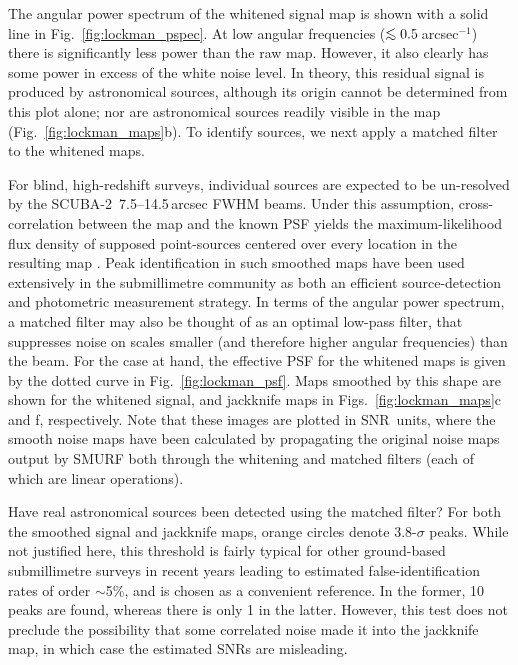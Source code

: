 \documentclass[useAMS,usenatbib,nofootinbib]{mn2e}
\newcommand{\snr}{SNR}
\newcommand{\scuba}{SCUBA-2}
\def\lsim{\mathrel{\lower2.5pt\vbox{\lineskip=0pt\baselineskip=0pt
          \hbox{$<$}\hbox{$\sim$}}}}
\begin{document}
The angular power spectrum of the whitened signal map is shown with a
solid line in Fig.~\ref{fig:lockman_pspec}. At low angular frequencies
($\lsim 0.5$\,arcsec$^{-1}$) there is significantly less power than
the raw map. However, it also clearly has some power in excess of the
white noise level. In theory, this residual signal is produced by
astronomical sources, although its origin cannot be determined from
this plot alone; nor are astronomical sources readily visible in the
map (Fig.~\ref{fig:lockman_maps}b). To identify sources, we next apply
a matched filter to the whitened maps.

For blind, high-redshift surveys, individual sources are expected to
be un-resolved by the \scuba\ 7.5--14.5\,arcsec FWHM beams. Under this
assumption, cross-correlation between the map and the known PSF yields
the maximum-likelihood flux density of supposed point-sources centered
over every location in the resulting map \citep[an extremely
well-known result throughout astronomy, see][]{stetson1987}. Peak
identification in such smoothed maps have been used extensively in the
submillimetre community as both an efficient source-detection and
photometric measurement strategy. In terms of the angular power
spectrum, a matched filter may also be thought of as an optimal
low-pass filter, that suppresses noise on scales smaller (and
therefore higher angular frequencies) than the beam. For the case at
hand, the effective PSF for the whitened maps is given by the dotted
curve in Fig.~\ref{fig:lockman_psf}. Maps smoothed by this shape are
shown for the whitened signal, and jackknife maps in
Figs.~\ref{fig:lockman_maps}c and f, respectively. Note that these
images are plotted in \snr\ units, where the smooth noise maps have
been calculated by propagating the original noise maps output by SMURF
both through the whitening and matched filters (each of which are
linear operations).

Have real astronomical sources been detected using the matched filter?
For both the smoothed signal and jackknife maps, orange circles denote
3.8-$\sigma$ peaks. While not justified here, this threshold is fairly
typical for other ground-based submillimetre surveys in recent years
\citep[e.g.,][]{coppin2006,perera2008,2009ApJ...707.1201W} leading to
estimated false-identification rates of order $\sim$5\%, and is chosen
as a convenient reference. In the former, 10 peaks are found, whereas
there is only 1 in the latter. However, this test does not preclude
the possibility that some correlated noise made it into the jackknife
map, in which case the estimated \snr s are misleading.
\end{document}
